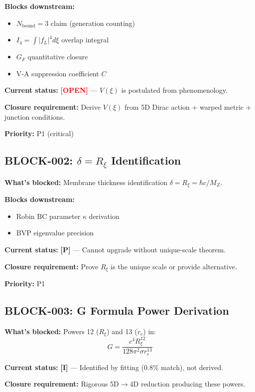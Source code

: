 \documentclass[11pt,a4paper]{article}
\newcommand{\tagP}{\textcolor{red!70!black}{\textbf{[P]}}}
\newcommand{\tagI}{\textcolor{orange!80!black}{\textbf{[I]}}}
\newcommand{\tagOPEN}{\textcolor{red}{\textbf{[OPEN]}}}
\begin{document}
\textbf{Blocks downstream:}
\begin{itemize}[nosep]
    \item $N_{\text{bound}} = 3$ claim (generation counting)
    \item $I_4 = \int |f_L|^4 d\xi$ overlap integral
    \item $G_F$ quantitative closure
    \item V-A suppression coefficient $C$
\end{itemize}

\textbf{Current status:} \tagOPEN{} --- $V(\xi)$ is postulated from phenomenology.

\textbf{Closure requirement:} Derive $V(\xi)$ from 5D Dirac action + warped metric + junction conditions.

\textbf{Priority:} P1 (critical)

\subsection{BLOCK-002: $\delta = R_\xi$ Identification}

\textbf{What's blocked:} Membrane thickness identification $\delta = R_\xi = \hbar c / M_Z$.

\textbf{Blocks downstream:}
\begin{itemize}[nosep]
    \item Robin BC parameter $\kappa$ derivation
    \item BVP eigenvalue precision
\end{itemize}

\textbf{Current status:} \tagP{} --- Cannot upgrade without unique-scale theorem.

\textbf{Closure requirement:} Prove $R_\xi$ is the unique scale or provide alternative.

\textbf{Priority:} P1

\subsection{BLOCK-003: G Formula Power Derivation}

\textbf{What's blocked:} Powers 12 ($R_\xi$) and 13 ($r_e$) in:
\begin{equation}
    G = \frac{c^4 R_\xi^{12}}{128\pi^2 \sigma r_e^{13}}
\end{equation}

\textbf{Current status:} \tagI{} --- Identified by fitting (0.8\% match), not derived.

\textbf{Closure requirement:} Rigorous 5D$\to$4D reduction producing these powers.
\end{document}
